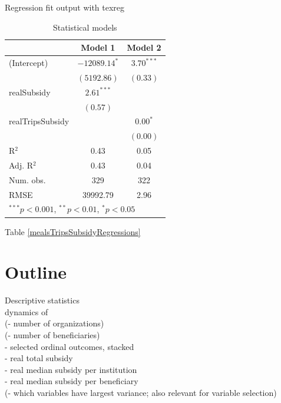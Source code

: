 \documentclass[12pt, a4paper, titlepage]{article}\usepackage[]{graphicx}\usepackage[]{color}
\begin{document}
Regression fit output with texreg\\


\begin{table}
\begin{center}
\begin{tabular}{l c c }
\hline
 & Model 1 & Model 2 \\
\hline
(Intercept)      & $-12089.14^{*}$ & $3.70^{***}$ \\
                 & $(5192.86)$     & $(0.33)$     \\
realSubsidy      & $2.61^{***}$    &              \\
                 & $(0.57)$        &              \\
realTripsSubsidy &                 & $0.00^{*}$   \\
                 &                 & $(0.00)$     \\
\hline
R$^2$            & 0.43            & 0.05         \\
Adj. R$^2$       & 0.43            & 0.04         \\
Num. obs.        & 329             & 322          \\
RMSE             & 39992.79        & 2.96         \\
\hline
\multicolumn{3}{l}{\scriptsize{$^{***}p<0.001$, $^{**}p<0.01$, $^*p<0.05$}}
\end{tabular}
\caption{Statistical models}
\label{table:coefficients}
\end{center}
\end{table}


Table \ref{mealsTripsSubsidyRegressions}
\section{Outline}
Descriptive statistics\\
dynamics of\\ 
(- number of organizations)\\
(- number of beneficiaries)\\
- selected ordinal outcomes, stacked\\
- real total subsidy\\
- real median subsidy per institution\\
- real median subsidy per beneficiary\\
(- which variables have largest variance; also relevant for variable selection)\\
\end{document}
